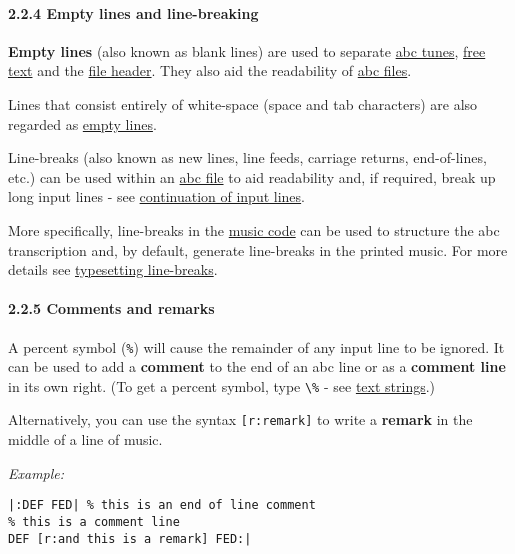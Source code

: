 \hypertarget{empty_lines_and_line-breaking}{\paragraph{2.2.4 Empty lines
and line-breaking}\label{empty_lines_and_line-breaking}}

\href{}{}\textbf{Empty lines} (also known as blank lines) are used to
separate \protect\hyperlink{abc_tune_definition}{abc tunes},
\protect\hyperlink{free_text_definition}{free text} and the
\protect\hyperlink{file_header_definition}{file header}. They also aid
the readability of \protect\hyperlink{abc_file_definition}{abc files}.

Lines that consist entirely of white-space (space and tab characters)
are also regarded as \protect\hyperlink{empty_line_definition}{empty
lines}.

Line-breaks (also known as new lines, line feeds, carriage returns,
end-of-lines, etc.) can be used within an
\protect\hyperlink{abc_file_definition}{abc file} to aid readability
and, if required, break up long input lines - see
\protect\hyperlink{continuation_of_input_lines}{continuation of input
lines}.

More specifically, line-breaks in the
\protect\hyperlink{music_code_definition}{music code} can be used to
structure the abc transcription and, by default, generate line-breaks in
the printed music. For more details see
\protect\hyperlink{typesetting_line-breaks}{typesetting line-breaks}.

\hypertarget{comments_and_remarks}{\paragraph{2.2.5 Comments and
remarks}\label{comments_and_remarks}}

\href{}{}A percent symbol (\texttt{\%}) will cause the remainder of any
input line to be ignored. It can be used to add a \textbf{comment} to
the end of an abc line or as a \textbf{comment line} in its own right.
(To get a percent symbol, type \texttt{\textbackslash{}\%} - see
\protect\hyperlink{text_strings}{text strings}.)

\href{}{}Alternatively, you can use the syntax \texttt{{[}r:remark{]}}
to write a \textbf{remark} in the middle of a line of music.

\emph{Example:}

\begin{verbatim}
|:DEF FED| % this is an end of line comment
% this is a comment line
DEF [r:and this is a remark] FED:|
\end{verbatim}

